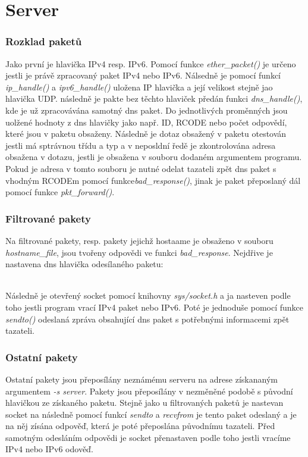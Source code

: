 \documentclass[a4paper, 11pt]{article}
\begin{document}
\section{Server}

\subsubsection{Rozklad paketů}
 Jako první je hlavička IPv4 resp. IPv6. Pomocí funkce \textit{ether\_packet()} je určeno jestli je právě zpracovaný paket IPv4 nebo IPv6. Nálsedně je pomocí funkcí \textit{ip\_handle()} a \textit{ipv6\_handle()} uložena IP hlavička a její velikost stejně jao hlavička UDP. následně je pakte bez těchto hlaviček předán funkci \textit{dns\_handle()}, kde je už zpracovávána samotný dns paket. Do jednotlivých proměnných jsou uolžené hodnoty z dns hlavičky jako např. ID, RCODE nebo počet odpovědí, které jsou v paketu obsaženy. Následně je dotaz obsažený v paketu otestován jestli má sptrávnou třídu a typ a v neposldní ředě je zkontrolována adresa obsažena v dotazu, jestli je obsažena v souboru dodaném argumentem programu. Pokud je adresa v tomto souboru je nutné odelat tazateli zpět dns paket s vhodným RCODEm pomocí funkce\textit{bad\_response()}, jinak je paket přeposlaný dál pomocí funkce \textit{pkt\_forward()}.
 
\subsubsection{Filtrované pakety}
Na filtrované pakety, resp. pakety jejichž hostaame je obsaženo v souboru \textit{hostname\_file}, jsou tvořeny odpovědi ve funkci \textit{bad\_response}. Nejdřive je nastavena dns hlavička odesílaného paketu:\\
\begin{figure}[h]
\end{figure}\\
Následně je otevřený socket pomocí knihovny \textit{sys/socket.h} a ja nasteven podle toho jestli program vrací IPv4 paket nebo IPv6. Poté je jednoduše pomocí funkce \textit{sendto()} odeslaná zpráva obsahující dns paket s potřebnými informacemi zpět tazateli.

\subsubsection{Ostatní pakety}
Ostatní pakety jsou přeposílány neznámému serveru na adrese získananým argumentem \textit{-s server}. Pakety jsou přeposílány v nezměněné podobě s původní hlavičkou ze získaného paketu. Stejně jako u filtrovaných paketů je nastevan socket na následně pomocí funkcí \textit{sendto} a \textit{recvfrom} je tento paket odeslaný a je na něj zísána odpověď, která je poté přeposlána původnímu tazateli. Před samotným odesláním odpovědi je socket přenastaven podle toho jestli vracíme IPv4 nebo IPv6 odověď.
\end{document}
